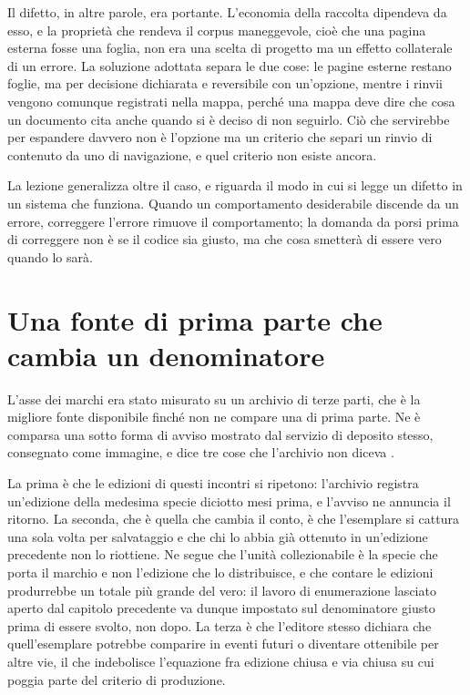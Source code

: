Il difetto, in altre parole, era portante. L'economia della raccolta dipendeva da esso, e la proprietà che rendeva il corpus maneggevole, cioè che una pagina esterna fosse una foglia, non era una scelta di progetto ma un effetto collaterale di un errore. La soluzione adottata separa le due cose: le pagine esterne restano foglie, ma per decisione dichiarata e reversibile con un'opzione, mentre i rinvii vengono comunque registrati nella mappa, perché una mappa deve dire che cosa un documento cita anche quando si è deciso di non seguirlo. Ciò che servirebbe per espandere davvero non è l'opzione ma un criterio che separi un rinvio di contenuto da uno di navigazione, e quel criterio non esiste ancora.

La lezione generalizza oltre il caso, e riguarda il modo in cui si legge un difetto in un sistema che funziona. Quando un comportamento desiderabile discende da un errore, correggere l'errore rimuove il comportamento; la domanda da porsi prima di correggere non è se il codice sia giusto, ma che cosa smetterà di essere vero quando lo sarà.

\section{Una fonte di prima parte che cambia un denominatore}

L'asse dei marchi era stato misurato su un archivio di terze parti, che è la migliore fonte disponibile finché non ne compare una di prima parte. Ne è comparsa una sotto forma di avviso mostrato dal servizio di deposito stesso, consegnato come immagine, e dice tre cose che l'archivio non diceva \cite{avviso-home-mightiest}.

La prima è che le edizioni di questi incontri si ripetono: l'archivio registra un'edizione della medesima specie diciotto mesi prima, e l'avviso ne annuncia il ritorno. La seconda, che è quella che cambia il conto, è che l'esemplare si cattura una sola volta per salvataggio e che chi lo abbia già ottenuto in un'edizione precedente non lo riottiene. Ne segue che l'unità collezionabile è la specie che porta il marchio e non l'edizione che lo distribuisce, e che contare le edizioni produrrebbe un totale più grande del vero: il lavoro di enumerazione lasciato aperto dal capitolo precedente va dunque impostato sul denominatore giusto prima di essere svolto, non dopo. La terza è che l'editore stesso dichiara che quell'esemplare potrebbe comparire in eventi futuri o diventare ottenibile per altre vie, il che indebolisce l'equazione fra edizione chiusa e via chiusa su cui poggia parte del criterio di produzione.

